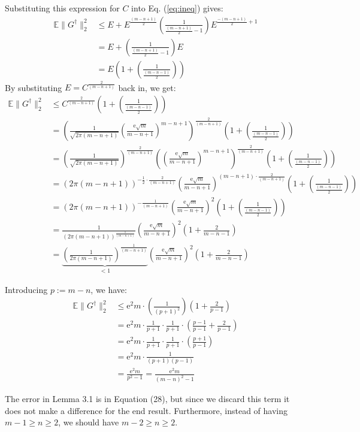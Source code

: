 \documentclass{article}
\begin{document}
Substituting this expression for $C$ into Eq. (\ref{eq:ineq}) gives:
\begin{align}
\mathbb{E}\|G^\dag\|_2^2 &\leq E + E^{\frac{(m-n+1)}{2}} 	\left(\frac{1}{\frac{(m-n+1)}{2}-1}\right) E^{\frac{-(m-n+1)}{2}+1} \\ &= E + \left(\frac{1}{\frac{(m-n+1)}{2}-1}\right)E \\
&= E\left(1 + \left(\frac{1}{\frac{(m-n-1)}{2}}\right)\right)
\end{align}
By substituting $E=C^{\frac{2}{(m-n+1)}}$ back in, we get:
\begin{align}
\mathbb{E}\|G^\dag\|_2^2 &\leq C^{\frac{2}{(m-n+1)}} 	\left(1 + \left(\frac{1}{\frac{(m-n-1)}{2}}\right)\right) \\
&= \left(\frac{1}{\sqrt{2\pi(m-n+1)}} \left(\frac{\text{e} \sqrt{m}}{m-n+1} \right)^{m-n+1}\right)^{\frac{2}{(m-n+1)}} \left(1 + \left(\frac{1}{\frac{(m-n-1)}{2}}\right)\right) 
\\ 
&= \left(\frac{1}{\sqrt{2\pi(m-n+1)}}\right)^{\frac{2}{(m-n+1)}}  \left(\left(\frac{\text{e} \sqrt{m}}{m-n+1} \right)^{m-n+1}\right)^{\frac{2}{(m-n+1)}} \left(1 + \left(\frac{1}{\frac{(m-n-1)}{2}}\right)\right) \\
&= \left(2\pi(m-n+1)\right)^{-\frac{1}{2} \cdot \frac{2}{(m-n+1)}} \left( \frac{\text{e} \sqrt{m}}{m-n+1}\right)^{(m-n+1) \cdot \frac{2}{(m-n+1)}} \left(1 + \left(\frac{1}{\frac{(m-n-1)}{2}}\right)\right)
\\ 
&= (2\pi(m-n+1))^{-\frac{1}{(m-n+1)}} \left( \frac{\text{e} \sqrt{m}}{m-n+1}\right)^{2} \left(1 + \left(\frac{1}{\frac{(m-n-1)}{2}}\right)\right)
\\
&= \frac{1}{(2\pi (m-n+1))^\frac{1}{(m-n+1)}} \left( \frac{\text{e} \sqrt{m}}{m-n+1}\right)^{2} \left(1 + \frac{2}{m-n-1}\right)
\\
&= \underbrace{\left(\frac{1}{2\pi (m-n+1)}\right)^{\frac{1}{(m-n+1)}}}_{< 1}\left( \frac{\text{e} \sqrt{m}}{m-n+1}\right)^{2} \left(1 + \frac{2}{m-n-1}\right)
\end{align}

Introducing $p:=m-n$, we have:
\begin{align}
	\mathbb{E}\|G^\dag\|_2^2 &\leq \text{e}^2m \cdot \left(\frac{1}{(p+1)^2} \right) \left(1 + \frac{2}{p-1}\right)
\\ &= \text{e}^2m \cdot \frac{1}{p+1} \cdot \frac{1}{p+1} \cdot \left(\frac{p-1}{p-1} + \frac{2}{p-1}\right)
\\ &= \text{e}^2m \cdot \frac{1}{p+1}\cdot \frac{1}{p+1} \cdot \left( \frac{p+1}{p-1}\right)
\\ &= \text{e}^2m \cdot \frac{1}{(p+1)(p-1)}
\\ &= \frac{\text{e}^2m}{p^2-1} = \frac{\text{e}^2m}{(m-n)^2-1}
\end{align}

The error in Lemma 3.1 is in Equation (28), but since we discard this term it does not make a difference for the end result. Furthermore, instead of having $m -1 \geq n \geq 2$, we should have $m-2 \geq n \geq 2$. 
\end{document}
